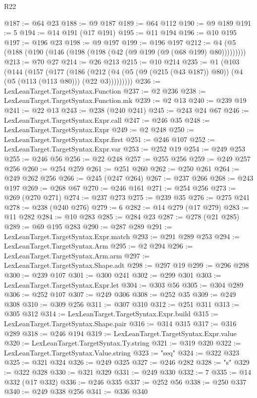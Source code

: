 \begin{lexlean}{R22}
\begin{coremodule}
@187 := @64 @23
@188 := @9 @187
@189 := @64 @112
@190 := @9 @189
@191 := 5
@194 := @14 @191 (@17 @191)
@195 := @11 @194
@196 := @10 @195
@197 := @196 @23
@198 := @9 @197
@199 := @196 @197
@212 := @4 (@5 (@188 (@190 (@146 (@198 (@198 (@42 (@9 @199 (@9 (@68 @199) @80)))))))))
@213 := @70 @27
@214 := @26 @213
@215 := @10 @214
@235 := @1
    (@103
      (@144
        (@157
          (@177
            (@186
              (@212 (@4 (@5 (@9 (@215 (@43 @187)) @80)) (@4 (@5 (@113 (@113 @80))) (@22 @3)))))))))
@236 := LexLeanTarget.TargetSyntax.Function
@237 := @2 @236
@238 := LexLeanTarget.TargetSyntax.Function.mk
@239 := @2 @13
@240 := @239 @19
@241 := @22 @13
@243 := @238 (@240 @241)
@245 := @243 @24 @67
@246 := LexLeanTarget.TargetSyntax.Expr.call
@247 := @246 @35
@248 := LexLeanTarget.TargetSyntax.Expr
@249 := @2 @248
@250 := LexLeanTarget.TargetSyntax.Expr.first
@251 := @246 @107
@252 := LexLeanTarget.TargetSyntax.Expr.var
@253 := @252 @19
@254 := @249 @253
@255 := @246 @56
@256 := @22 @248
@257 := @255 @256
@259 := @249 @257 @256
@260 := @254 @259
@261 := @251 @260
@262 := @250 @261
@264 := @249 @262 @256
@266 := @245 (@247 @264)
@267 := @237 @266
@268 := @243 @197
@269 := @268 @67
@270 := @246 @161
@271 := @254 @256
@273 := @269 (@270 @271)
@274 := @237 @273
@275 := @239 @35
@276 := @275 @241
@278 := @238 (@240 @276)
@279 := 6
@282 := @14 @279 (@17 @279)
@283 := @11 @282
@284 := @10 @283
@285 := @284 @23
@287 := @278 (@21 @285)
@289 := @69 @195 @283
@290 := @287 @289
@291 := LexLeanTarget.TargetSyntax.Expr.match
@293 := @291 @289 @253
@294 := LexLeanTarget.TargetSyntax.Arm
@295 := @2 @294
@296 := LexLeanTarget.TargetSyntax.Arm.arm
@297 := LexLeanTarget.TargetSyntax.Shape.adt
@298 := @297 @19
@299 := @296 @298
@300 := @239 @107
@301 := @300 @241
@302 := @299 @301
@303 := LexLeanTarget.TargetSyntax.Expr.let
@304 := @303 @56
@305 := @304 @289
@306 := @252 @107
@307 := @249 @306
@308 := @252 @35
@309 := @249 @308
@310 := @309 @256
@311 := @307 @310
@312 := @251 @311
@313 := @305 @312
@314 := LexLeanTarget.TargetSyntax.Expr.build
@315 := LexLeanTarget.TargetSyntax.Shape.pair
@316 := @314 @315
@317 := @316 @289
@318 := @246 @194
@319 := LexLeanTarget.TargetSyntax.Expr.value
@320 := LexLeanTarget.TargetSyntax.Ty.string
@321 := @319 @320
@322 := LexLeanTarget.TargetSyntax.Value.string
@323 := "seq"
@324 := @322 @323
@325 := @321 @324
@326 := @249 @325
@327 := @246 @282
@328 := "s"
@329 := @322 @328
@330 := @321 @329
@331 := @249 @330
@332 := 7
@335 := @14 @332 (@17 @332)
@336 := @246 @335
@337 := @252 @56
@338 := @250 @337
@340 := @249 @338 @256
@341 := @336 @340

\end{coremodule}
\end{lexlean}
